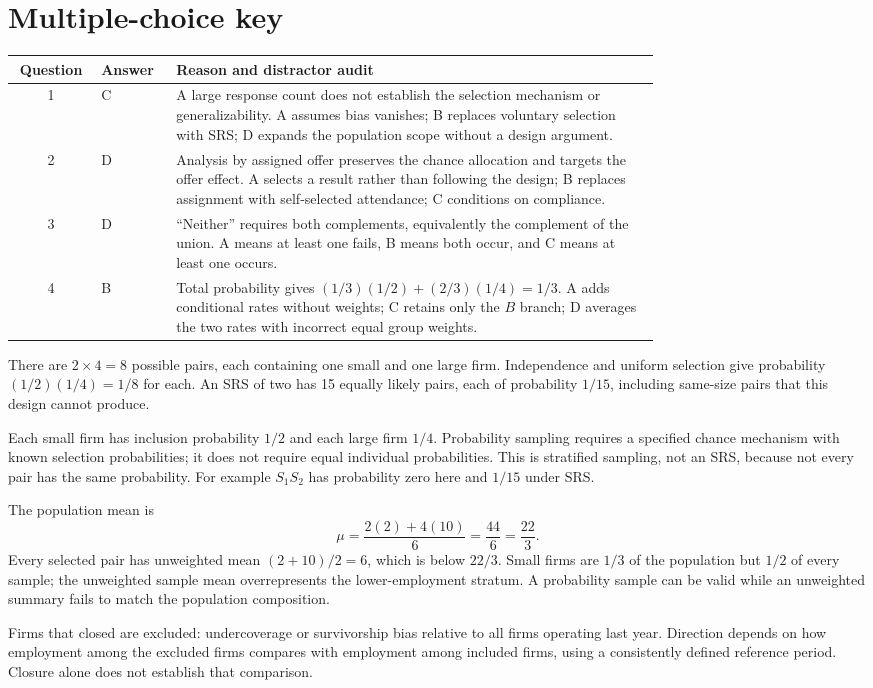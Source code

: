 \documentclass[11pt]{article}
\begin{document}
\section*{Multiple-choice key}
\begin{tabular}{clp{0.75\linewidth}}\toprule
Question & Answer & Reason and distractor audit \\\midrule
1 & C & A large response count does not establish the selection mechanism or generalizability. A assumes bias vanishes; B replaces voluntary selection with SRS; D expands the population scope without a design argument. \\[5pt]
2 & D & Analysis by assigned offer preserves the chance allocation and targets the offer effect. A selects a result rather than following the design; B replaces assignment with self-selected attendance; C conditions on compliance. \\[5pt]
3 & D & ``Neither'' requires both complements, equivalently the complement of the union. A means at least one fails, B means both occur, and C means at least one occurs. \\[5pt]
4 & B & Total probability gives $(1/3)(1/2)+(2/3)(1/4)=1/3$. A adds conditional rates without weights; C retains only the $B$ branch; D averages the two rates with incorrect equal group weights. \\\bottomrule
\end{tabular}

\begin{parts}
\item There are $2\times4=8$ possible pairs, each containing one small and one large firm. Independence and uniform selection give probability $(1/2)(1/4)=1/8$ for each. An SRS of two has 15 equally likely pairs, each of probability $1/15$, including same-size pairs that this design cannot produce.
\item Each small firm has inclusion probability $1/2$ and each large firm $1/4$. Probability sampling requires a specified chance mechanism with known selection probabilities; it does not require equal individual probabilities. This is stratified sampling, not an SRS, because not every pair has the same probability. For example $S_1S_2$ has probability zero here and $1/15$ under SRS.
\item The population mean is
\[
\mu=\frac{2(2)+4(10)}6=\frac{44}6=\frac{22}3.
\]
Every selected pair has unweighted mean $(2+10)/2=6$, which is below $22/3$. Small firms are $1/3$ of the population but $1/2$ of every sample; the unweighted sample mean overrepresents the lower-employment stratum. A probability sample can be valid while an unweighted summary fails to match the population composition.
\item Firms that closed are excluded: undercoverage or survivorship bias relative to all firms operating last year. Direction depends on how employment among the excluded firms compares with employment among included firms, using a consistently defined reference period. Closure alone does not establish that comparison.
\end{parts}
\end{document}
